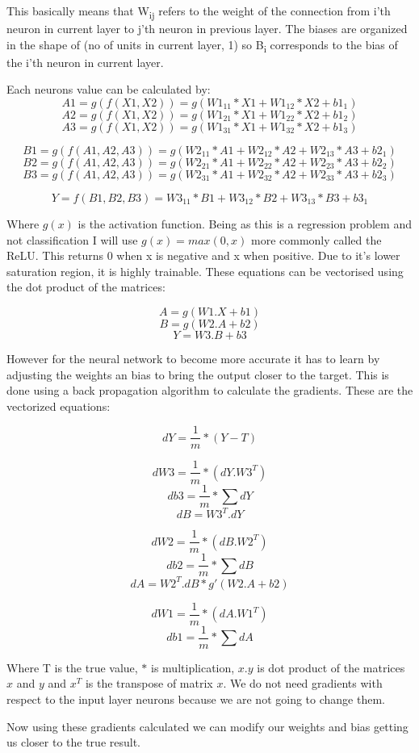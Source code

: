 \documentclass[11pt]{article}
\begin{document}
	This basically means that W\textsubscript{ij} refers to the weight of the connection from i’th neuron in current layer to j’th neuron in previous layer. The biases are organized in the shape of (no of units in current layer, 1) so B\textsubscript{i} corresponds to the bias of the i’th neuron in current layer. 
	
	Each neurons value can be calculated by:
	\[A1 = g(f(X1,X2)) = g(W1_{11}*X1 + W1_{12}*X2 + b1_{1})\]
	\[A2 = g(f(X1,X2)) = g(W1_{21}*X1 + W1_{22}*X2 + b1_{2})\]
	\[A3 = g(f(X1,X2)) = g(W1_{31}*X1 + W1_{32}*X2 + b1_{3})\]
	
	\[B1 = g(f(A1,A2,A3)) = g(W2_{11}*A1 + W2_{12}*A2 + W2_{13}*A3 + b2_{1})\]
	\[B2 = g(f(A1,A2,A3)) = g(W2_{21}*A1 + W2_{22}*A2 + W2_{23}*A3 + b2_{2})\]
	\[B3 = g(f(A1,A2,A3)) = g(W2_{31}*A1 + W2_{32}*A2 + W2_{33}*A3 + b2_{3})\]
	
	\[Y = f(B1,B2,B3) = W3_{11}*B1 + W3_{12}*B2 + W3_{13}*B3 + b3_{1}\]
	
	Where $g(x)$ is the activation function. Being as this is a regression problem and not classification I will use $g(x) = max(0,x)$ more commonly called the ReLU. This returns 0 when x is negative and x when positive. Due to it’s lower saturation region, it is highly trainable. These equations can be vectorised using the dot product of the matrices:
	
	\[A = g(W1.X + b1)\]
	\[B = g(W2.A + b2)\]
	\[Y = W3.B + b3\]
	
	However for the neural network to become more accurate it has to learn by adjusting the weights an bias to bring the output closer to the target. This is done using a back propagation algorithm to calculate the gradients. These are the vectorized equations:
	
	\[dY = \frac{1}{m} * (Y-T) \]
	
	\[dW3 = \frac{1}{m} * (dY.W3^T) \]
	\[db3 = \frac{1}{m} * \sum dY \]
	\[dB = W3^T.dY\]
	
	\[dW2 = \frac{1}{m} * (dB.W2^T) \]
	\[db2 = \frac{1}{m} * \sum dB \]
	\[dA = W2^T.dB * g'(W2.A+b2)\]
	
	\[dW1 = \frac{1}{m} * (dA.W1^T) \]
	\[db1 = \frac{1}{m} * \sum dA \]
	
	Where T is the true value, $*$ is multiplication, $x.y$ is dot product of the matrices $x$ and $y$ and $x^T$ is the transpose of matrix $x$. We do not need gradients with respect to the input layer neurons because we are not going to change them.

	Now using these gradients calculated we can modify our weights and bias getting us closer to the true result.
	
\end{document}
